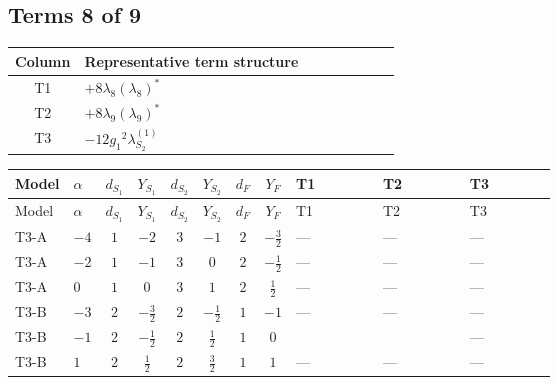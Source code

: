 \documentclass[8pt]{article}
\begin{document}
\begin{landscape}
\subsection*{Terms 8 of 9}
\begin{center}
\begin{tabular}{@{}c >{\raggedright\arraybackslash}p{0.82\linewidth}@{}}
\toprule
Column & Representative term structure \\
\midrule
T1 & \(\displaystyle +8 {\lambda_{8}} \left({\lambda_{8}}\right)^{*}\) \\
\midrule
T2 & \(\displaystyle +8 {\lambda_{9}} \left({\lambda_{9}}\right)^{*}\) \\
\midrule
T3 & \(\displaystyle -12 {g_1}^2 {\lambda_{S_2}^{(1)}}\) \\
\midrule
\bottomrule
\end{tabular}
\end{center}
\smallskip
\tiny
\begin{longtable}{@{}llcccccc >{\raggedright\arraybackslash}p{0.21\linewidth} >{\raggedright\arraybackslash}p{0.21\linewidth} >{\raggedright\arraybackslash}p{0.21\linewidth}@{}}
\toprule
Model & $\alpha$ & $d_{S_1}$ & $Y_{S_1}$ & $d_{S_2}$ & $Y_{S_2}$ & $d_F$ & $Y_F$ & T1 & T2 & T3 \\
\midrule
\endfirsthead
\toprule
Model & $\alpha$ & $d_{S_1}$ & $Y_{S_1}$ & $d_{S_2}$ & $Y_{S_2}$ & $d_F$ & $Y_F$ & T1 & T2 & T3 \\
\midrule
\endhead
T3-A & $-4$ & $1$ & $-2$ & $3$ & $-1$ & $2$ & $-\frac{3}{2}$ & --- & --- & --- \\
\midrule
T3-A & $-2$ & $1$ & $-1$ & $3$ & $0$ & $2$ & $-\frac{1}{2}$ & --- & --- & --- \\
\midrule
T3-A & $0$ & $1$ & $0$ & $3$ & $1$ & $2$ & $\frac{1}{2}$ & --- & --- & --- \\
\midrule
T3-B & $-3$ & $2$ & $-\frac{3}{2}$ & $2$ & $-\frac{1}{2}$ & $1$ & $-1$ & --- & --- & --- \\
\midrule
T3-B & $-1$ & $2$ & $-\frac{1}{2}$ & $2$ & $\frac{1}{2}$ & $1$ & $0$ & \scriptsize\adjustbox{max width=\linewidth}{$\begin{gathered} +8 {\lambda_{8}} \left({\lambda_{8}}\right)^{*}\end{gathered}$} & \scriptsize\adjustbox{max width=\linewidth}{$\begin{gathered} +8 {\lambda_{9}} \left({\lambda_{9}}\right)^{*}\end{gathered}$} & --- \\
\midrule
T3-B & $1$ & $2$ & $\frac{1}{2}$ & $2$ & $\frac{3}{2}$ & $1$ & $1$ & --- & --- & --- \\

\end{longtable}
\end{landscape}
\end{document}
